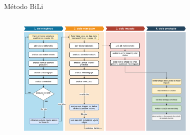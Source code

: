 \begin{frame}{Método BiLi}
	\begin{columns}
        \begin{figure}[!hb]
            \includegraphics[width=1\textwidth]{figures/bili.png}
        \end{figure}
		\begin{figure}[hb]

\end{figure}
\end{columns}
\end{frame}
